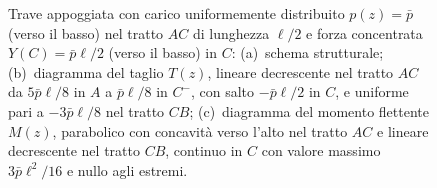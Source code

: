 \begin{figure}[htbp]
{
			}
			\caption{Trave appoggiata con carico uniformemente distribuito
				$p(z) = \bar{p}$ (verso il basso) nel tratto $AC$ di
				lunghezza $\ell/2$ e forza concentrata $Y(C) = \bar{p}\ell/2$
				(verso il basso) in $C$:
				(a)~schema strutturale;
				(b)~diagramma del taglio $T(z)$, lineare decrescente nel
				tratto $AC$ da $5\bar{p}\ell/8$ in $A$ a $\bar{p}\ell/8$
				in $C^-$, con salto $-\bar{p}\ell/2$ in $C$, e uniforme
				pari a $-3\bar{p}\ell/8$ nel tratto $CB$;
				(c)~diagramma del momento flettente $M(z)$, parabolico con
				concavità verso l'alto nel tratto $AC$ e lineare decrescente
				nel tratto $CB$, continuo in $C$ con valore massimo
				$3\bar{p}\ell^2/16$ e nullo agli estremi.}
			\label{fig:stat_trasv_iso_01}
		\end{figure}
